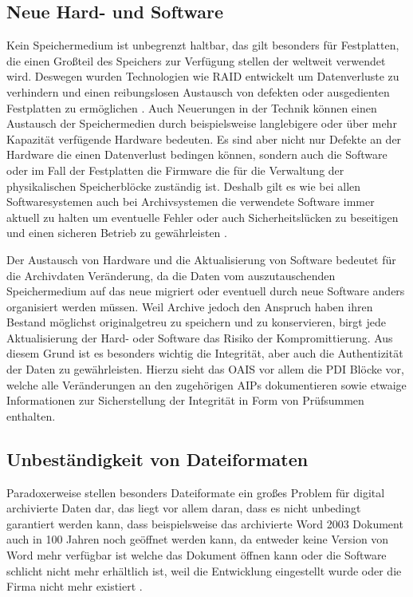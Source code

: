 \documentclass[conference,compsoc,final,a4paper]{IEEEtran}
\begin{document}
\subsection{Neue Hard- und Software}
Kein Speichermedium ist unbegrenzt haltbar, das gilt besonders für Festplatten, die einen Großteil des Speichers zur Verfügung stellen der weltweit verwendet wird. Deswegen wurden Technologien wie \ac{RAID} entwickelt um Datenverluste zu verhindern und einen reibungslosen Austausch von defekten oder ausgedienten Festplatten zu ermöglichen \autocite{Lakshmi2008}. Auch Neuerungen in der Technik können einen Austausch der Speichermedien durch beispielsweise langlebigere oder über mehr Kapazität verfügende Hardware bedeuten. Es sind aber nicht nur Defekte an der Hardware die einen Datenverlust bedingen können, sondern auch die Software oder im Fall der Festplatten die Firmware die für die Verwaltung der physikalischen Speicherblöcke zuständig ist. Deshalb gilt es wie bei allen Softwaresystemen auch bei Archivsystemen die verwendete Software immer aktuell zu halten um eventuelle Fehler oder auch Sicherheitslücken zu beseitigen und einen sicheren Betrieb zu gewährleisten \autocite{Lakshmi2008}.

Der Austausch von Hardware und die Aktualisierung von Software bedeutet für die Archivdaten Veränderung, da die Daten vom auszutauschenden Speichermedium auf das neue migriert oder eventuell durch neue Software anders organisiert werden müssen. Weil Archive jedoch den Anspruch haben ihren Bestand möglichst originalgetreu zu speichern und zu konservieren, birgt jede Aktualisierung der Hard- oder Software das Risiko der Kompromittierung. Aus diesem Grund ist es besonders wichtig die Integrität, aber auch die Authentizität der Daten zu gewährleisten. Hierzu sieht das \ac{OAIS} vor allem die \ac{PDI} Blöcke vor, welche alle Veränderungen an den zugehörigen \ac{AIP}s dokumentieren sowie etwaige Informationen zur Sicherstellung der Integrität in Form von Prüfsummen enthalten.

\subsection{Unbeständigkeit von Dateiformaten}
Paradoxerweise stellen besonders Dateiformate ein großes Problem für digital archivierte Daten dar, das liegt vor allem daran, dass es nicht unbedingt garantiert werden kann, dass beispielsweise das archivierte Word 2003 Dokument auch in 100 Jahren noch geöffnet werden kann, da entweder keine Version von Word mehr verfügbar ist welche das Dokument öffnen kann oder die Software schlicht nicht mehr erhältlich ist, weil die Entwicklung eingestellt wurde oder die Firma nicht mehr existiert \autocite{dpcFormatsStandards}.
\end{document}
